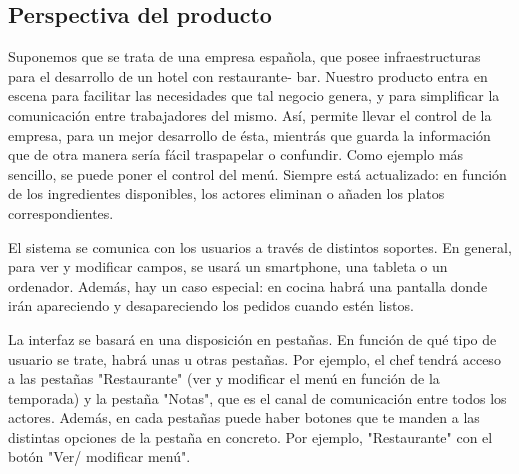 \documentclass[spanish,a4paper,12pt]{report}		%
\begin{document}
\subsection{Perspectiva del producto}

Suponemos que se trata de una empresa española, que posee infraestructuras para el desarrollo de un hotel con restaurante- bar. Nuestro producto entra en escena para facilitar las necesidades que tal negocio genera, y para simplificar la comunicación entre trabajadores del mismo. Así, permite llevar el control de la empresa, para un mejor desarrollo de ésta, mientrás que guarda la información que de otra manera sería fácil traspapelar o confundir. Como ejemplo más sencillo, se puede poner el control del menú. Siempre está actualizado: en función de los ingredientes disponibles, los actores eliminan o añaden los platos correspondientes. 

El sistema se comunica con los usuarios a través de distintos soportes. En general, para ver y modificar campos, se usará un smartphone, una tableta o un ordenador. Además, hay un caso especial: en cocina habrá una pantalla donde irán apareciendo y desapareciendo los pedidos cuando estén listos.

La interfaz se basará en una disposición en pestañas. En función de qué tipo de usuario se trate, habrá unas u otras pestañas. Por ejemplo, el chef tendrá acceso a las pestañas "Restaurante" (ver y modificar el menú en función de la temporada) y la pestaña "Notas", que es el canal de comunicación entre todos los actores. Además, en cada pestañas puede haber botones que te manden a las distintas opciones de la pestaña en concreto. Por ejemplo, "Restaurante" con el botón "Ver/ modificar menú".
\end{document}
